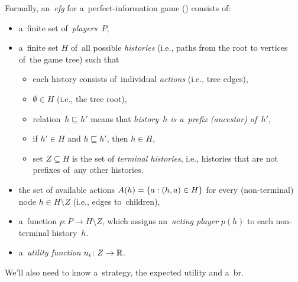 Formally, an~\emph{\acrfull{efg}} for a~perfect-information game (\cite[p.~200]{Osborne1994course}) consists of:
\begin{itemize}
  \item a~finite set of~\emph{players}~$P$,

  \item a~finite set $H$ of~all possible \emph{histories} (i.e., paths from the root to vertices of~the game tree) such that
    \begin{itemize}
      \item each history consists of~individual \emph{actions} (i.e., tree edges),
      \item $\emptyset \in H$ (i.e., the tree root),
      \item relation~$h \sqsubseteq h'$ means that \emph{history~$h$ is a~prefix (ancestor) of~$h'$},
      \item if $h' \in H$ and $h \sqsubseteq h'$, then $h \in H$,
      \item set $Z \subseteq H$ is the set of \emph{terminal histories}, i.e., histories that are not prefixes of~any other histories.
    \end{itemize}

  \item the set of available actions $A(h) = \left\{ a: (h, a) \in H \right\}$ for every (non-terminal) node $h \in H \setminus Z$ (i.e., edges to~children),

  \item a~function $p\colon P \to H \setminus Z$, which assigns an~\emph{acting player} $p(h)$ to each non-terminal history~$h$.

  \item a~\emph{utility function} $u_i\colon Z \rightarrow \mathbb{R}$.
\end{itemize}
We'll also need to know a~strategy, the expected utility and a~\acrfull{br}.

